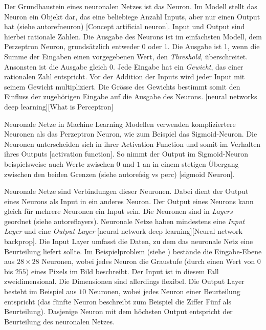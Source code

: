 Der Grundbaustein eines neuronalen Netzes ist das Neuron. Im Modell stellt das
Neuron ein Objekt dar, das eine beliebiege Anzahl Inputs, aber nur einen Output
hat (siehe autoref{neuron}) [Concept artificial neuron]. Input und Output sind
hierbei rationale Zahlen. Die Ausgabe des Neurons ist im einfachsten Modell, dem
Perzeptron Neuron, grundsätzlich entweder 0 oder 1. Die Ausgabe ist 1, wenn die Summe
der Eingaben einen vorgegebenen Wert, den \emph{Threshold}, überschreitet.
Ansonsten ist die Ausgabe gleich 0. Jede Eingabe hat ein \emph{Gewicht}, das
einer rationalen Zahl entspricht. Vor der Addition der Inputs wird jeder Input
mit seinem Gewicht multipliziert.  Die Grösse des Gewichts bestimmt somit den
Einfluss der zugehörigen Eingabe auf die Ausgabe des Neurons. [neural networks
deep learning][What is Perceptron]


Neuronale Netze in Machine Learning Modellen verwenden kompliziertere Neuronen
als das Perzeptron Neuron, wie zum Beispiel das Sigmoid-Neuron. Die Neuronen
unterscheiden sich in ihrer Activation Function und somit im Verhalten ihres
Outputs [activation function]. So nimmt der Output im Sigmoid-Neuron
beispielsweise auch Werte zwischen $0$ und $1$ an in einem stetigen Übergang
zwischen den beiden Grenzen (siehe autoref{sig vs perc}) [sigmoid Neuron].


Neuronale Netze sind Verbindungen dieser Neuronen. Dabei dient der Output eines
Neurons als Input in ein anderes Neuron. Der Output eines Neurons kann gleich
für mehrere Neuronen ein Input sein. Die Neuronen sind in \emph{Layers} geordnet
(siehe autoref{layers}). Neuronale Netze haben mindestens eine \emph{Input
Layer} und eine \emph{Output Layer} [neural network deep learning][Neural
network backprop]. Die Input Layer umfasst die Daten, zu dem das neuronale Netz
eine Beurteilung liefert sollte. Im Beispielproblem (siehe )
bestände die Eingabe-Ebene aus $28\times28$ Neuronen, wobei jedes Neuron die
Graustufe (durch einen Wert von $0$ bis $255$) eines Pixels im Bild beschreibt.
Der Input ist in diesem Fall zweidimensional. Die Dimensionen sind allerdings
flexibel. Die Output Layer besteht im Beispiel aus $10$ Neuronen, wobei jedes
Neuron einer Beurteilung entspricht (das fünfte Neuron beschreibt zum Beispiel
die Ziffer Fünf als Beurteilung). Dasjenige Neuron mit dem höchsten Output
entspricht der Beurteilung des neuronalen Netzes.

